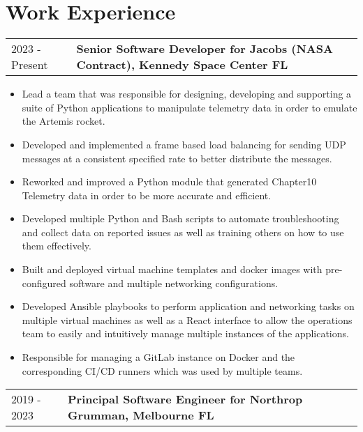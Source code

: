 \documentclass[11pt, letterpaper]{article}
\begin{document}
\section*{\selectfont Work Experience}
\vspace{-0.2cm}
\begin{tabular}{p{0.9in}|p{6.1in}}
    2023 - Present & \textbf{Senior Software Developer for Jacobs (NASA Contract), Kennedy Space Center FL}
\end{tabular}
\begin{itemize}[itemsep=0cm, parsep=0.2cm]
    \item Lead a team that was responsible for designing, developing and supporting a suite of Python applications to manipulate telemetry data in order to emulate the Artemis rocket.
    \item Developed and implemented a frame based load balancing for sending UDP messages at a consistent specified rate to better distribute the messages.
    \item Reworked and improved a Python module that generated Chapter10 Telemetry data in order to be more accurate and efficient.
    \item Developed multiple Python and Bash scripts to automate troubleshooting and collect data on reported issues as well as training others on how to use them effectively.
    \item Built and deployed virtual machine templates and docker images with pre-configured software and multiple networking configurations.
    \item Developed Ansible playbooks to perform application and networking tasks on multiple virtual machines as well as a React interface to allow the operations team to easily and intuitively manage multiple instances of the applications.
    \item Responsible for managing a GitLab instance on Docker and the corresponding CI/CD runners which was used by multiple teams.
\end{itemize}
\begin{tabular}{p{0.76in}|p{6.24in}}
    2019 - 2023 & \textbf{Principal Software Engineer for Northrop Grumman, Melbourne FL}
\end{tabular}
\end{document}
